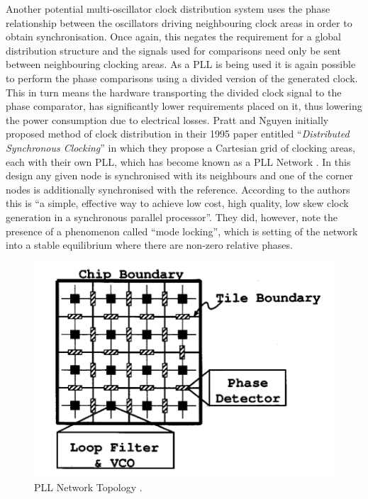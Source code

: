 Another potential multi-oscillator clock distribution system uses the phase relationship between the oscillators driving neighbouring clock areas in order to obtain synchronisation. Once again, this negates the requirement for a global distribution structure and the signals used for comparisons need only be sent between neighbouring clocking areas. As a \ac{PLL} is being used it is again possible to perform the phase comparisons using a divided version of the generated clock. This in turn means the hardware transporting the divided clock signal to the phase comparator, has significantly lower requirements placed on it, thus lowering the power consumption due to electrical losses. Pratt and Nguyen initially proposed method of clock distribution in their 1995 paper entitled ``\textit{Distributed Synchronous Clocking}'' in which they propose a Cartesian grid of clocking areas, each with their own \ac{PLL}, which has become known as a \ac{PLL} Network \cite{pratt1995distributed}. In this design any given node is synchronised with its neighbours and one of the corner nodes is additionally synchronised with the reference. According to the authors this is ``a simple, effective way to achieve low cost, high quality, low skew clock generation in a synchronous parallel processor''. They did, however, note the presence of a phenomenon called ``mode locking'', which is setting of the network into a stable equilibrium where there are non-zero relative phases.

\begin{figure}[h]
	\centering
	\includegraphics[scale=0.7]{../gutnik2000active}
	\caption{PLL Network Topology \cite{gutnik2000active}.}
	\label{fig:gutnik2000active}
\end{figure}

